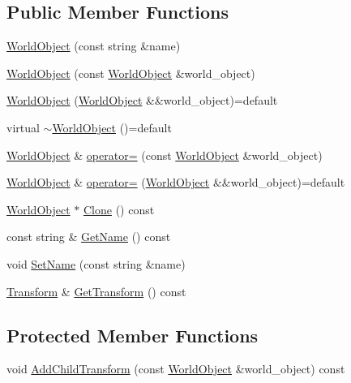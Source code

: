 \subsection*{Public Member Functions}
\begin{DoxyCompactItemize}
\item 
\hyperlink{classmage_1_1_world_object_a40d714ae9da1e197171c55f8fd321cc4}{World\+Object} (const string \&name)
\item 
\hyperlink{classmage_1_1_world_object_a4e7ace41518b45c75d975c766de28143}{World\+Object} (const \hyperlink{classmage_1_1_world_object}{World\+Object} \&world\+\_\+object)
\item 
\hyperlink{classmage_1_1_world_object_af8e2a82bd8a59d1ec8776e27ed5900cd}{World\+Object} (\hyperlink{classmage_1_1_world_object}{World\+Object} \&\&world\+\_\+object)=default
\item 
virtual \hyperlink{classmage_1_1_world_object_a6ae28ad98832c1e97b681816755a79f2}{$\sim$\+World\+Object} ()=default
\item 
\hyperlink{classmage_1_1_world_object}{World\+Object} \& \hyperlink{classmage_1_1_world_object_aa53dfc0e654aead5898d0cc76cbc9be6}{operator=} (const \hyperlink{classmage_1_1_world_object}{World\+Object} \&world\+\_\+object)
\item 
\hyperlink{classmage_1_1_world_object}{World\+Object} \& \hyperlink{classmage_1_1_world_object_a8dbb67991f149a2d4edbcd17ae4ec3ef}{operator=} (\hyperlink{classmage_1_1_world_object}{World\+Object} \&\&world\+\_\+object)=default
\item 
\hyperlink{classmage_1_1_world_object}{World\+Object} $\ast$ \hyperlink{classmage_1_1_world_object_a6f464ec7f71740bb89a3ffb0cf6369b2}{Clone} () const
\item 
const string \& \hyperlink{classmage_1_1_world_object_a3aab270d50a8d9ab1f9a970d3e04245f}{Get\+Name} () const
\item 
void \hyperlink{classmage_1_1_world_object_aee42f65080a69ed5cfc681382328fe31}{Set\+Name} (const string \&name)
\item 
\hyperlink{structmage_1_1_transform}{Transform} \& \hyperlink{classmage_1_1_world_object_a9f0ff4d1d3b3c2dd63e91e8127023f47}{Get\+Transform} () const
\end{DoxyCompactItemize}
\subsection*{Protected Member Functions}
\begin{DoxyCompactItemize}
\item 
void \hyperlink{classmage_1_1_world_object_a5c66de01e9b83c4c1fa6cd64e17443ee}{Add\+Child\+Transform} (const \hyperlink{classmage_1_1_world_object}{World\+Object} \&world\+\_\+object) const
\end{DoxyCompactItemize}
